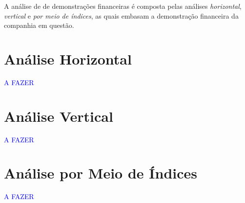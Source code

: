 A análise de de demonstrações financeiras é composta pelas análises \emph{horizontal}, \emph{vertical} e \emph{por meio de índices}, as quais embasam a demonstração financeira da companhia em questão.

\section{Análise Horizontal}

\textcolor{blue}{A FAZER}

\section{Análise Vertical}

\textcolor{blue}{A FAZER}

\section{Análise por Meio de Índices}

\textcolor{blue}{A FAZER}
